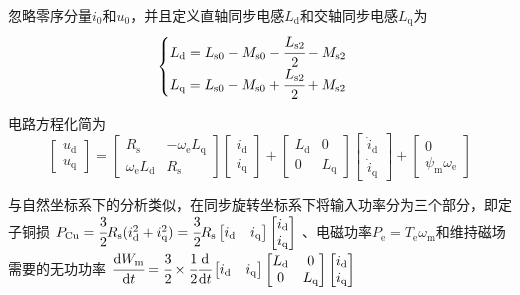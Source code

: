 忽略零序分量\(i_{\mathrm{0}}\)和\(u_{\mathrm{0}}\)，并且定义直轴同步电感\(L_{\mathrm{d}}\)和交轴同步电感\(L_{\mathrm{q}}\)为
\begin{equation}
    \begin{cases}
        L_{\mathrm{d}}=L_{\mathrm{s}0}-M_{\mathrm{s}0}-\cfrac{L_{\mathrm{s}2}}{2}-M_{\mathrm{s}2}\\
        L_{\mathrm{q}}=L_{\mathrm{s}0}-M_{\mathrm{s}0}+\cfrac{L_{\mathrm{s}2}}{2}+M_{\mathrm{s}2}
    \end{cases}
    \label{eq:同步电感定义式}
\end{equation}

电路方程化简为
\begin{equation}
    \begin{bmatrix}
        u_{\mathrm{d}}\\u_{\mathrm{q}}
    \end{bmatrix}
    =\begin{bmatrix}R_{\mathrm{s}}&-\omega_{\mathrm{e}}L_{\mathrm{q}}\\\omega_{\mathrm{e}}L_{\mathrm{d}}&R_{\mathrm{s}}\end{bmatrix}
    \begin{bmatrix}i_{\mathrm{d}}\\i_{\mathrm{q}}\end{bmatrix}
    +\begin{bmatrix}L_{\mathrm{d}}&0\\0&L_{\mathrm{q}}\end{bmatrix}
    \begin{bmatrix}\dot{i}_{\mathrm{d}}\\\dot{i}_{\mathrm{q}}\end{bmatrix}
    +\begin{bmatrix}0\\\psi_{\mathrm{m}}\omega_{\mathrm{e}}\end{bmatrix}
    \label{eq:同步坐标系下电路方程}
\end{equation}

与自然坐标系下的分析类似，在同步旋转坐标系下将输入功率分为三个部分，即定子铜损
\(P_{\mathrm{Cu}}=\cfrac{3}{2}R_{\mathrm{s}}(i_{\mathrm{d}}^2+i_{\mathrm{q}}^2)=
\cfrac 32R_{\mathrm{s}}\begin{bmatrix}i_{\mathrm{d}}&i_{\mathrm{q}}\end{bmatrix}
\begin{bmatrix}i_{\mathrm{d}}\\i_{\mathrm{q}}\end{bmatrix}\)
、电磁功率\(P_{\mathrm{e}}=T_{\mathrm{e}}\omega_{\mathrm{m}}\)和维持磁场需要的无功功率
\(\cfrac{\mathrm{d} W_{\mathrm{m}}}{\mathrm{d} t}=\cfrac 32\times\cfrac 12\cfrac{\mathrm{d}}{\mathrm{d} t}
\begin{bmatrix}i_{\mathrm{d}}&i_{\mathrm{q}}\end{bmatrix}
\begin{bmatrix}L_{\mathrm{d}}&0\\0&L_{\mathrm{q}}\end{bmatrix}
\begin{bmatrix}i_{\mathrm{d}}\\i_{\mathrm{q}}\end{bmatrix}\)

